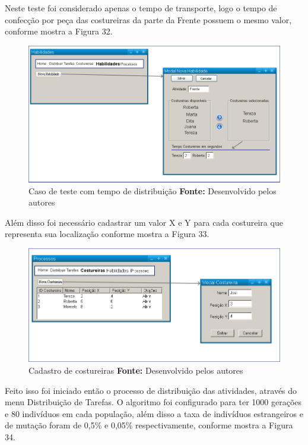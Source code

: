\par Neste teste foi considerado apenas o tempo de transporte, logo o tempo de confecção por peça das costureiras da parte 
da Frente possuem o mesmo valor, conforme mostra a Figura 32.


\begin{figure}[h!]
	\centerline{\includegraphics[scale=0.3]{./imagens/test_case_2_habilidades.png}}
	\caption[Caso de teste com tempo de distribuição]
	{Caso de teste com tempo de distribuição \textbf{Fonte:} Desenvolvido pelos autores}
	\label{fig:exemplo1}
\end{figure}

\newpage

\par Além disso foi necessário cadastrar um valor X e Y para cada costureira que representa sua localização conforme 
mostra a Figura 33.


\begin{figure}[h!]
	\centerline{\includegraphics[scale=0.3]{./imagens/test_case_2_costureiras.png}}
	\caption[Cadastro de costureiras]
	{Cadastro de costureiras \textbf{Fonte:} Desenvolvido pelos autores}
	\label{fig:exemplo1}
\end{figure}

\par \par Feito isso foi iniciado então o processo de distribuição das atividades, através do menu Distribuição de Tarefas.
O algoritmo foi configurado para ter 1000 gerações e 80 indivíduos em cada população, além disso a taxa de indivíduos
estrangeiros e de mutação foram de 0,5\% e 0,05\% respectivamente, conforme
mostra a Figura 34.

